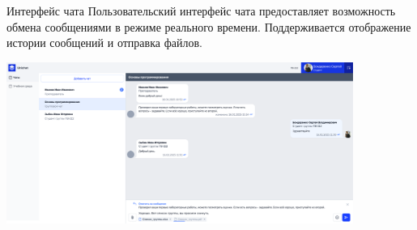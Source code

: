\documentclass[aspectratio=169]{beamer}
\begin{document}
\begin{frame}{Интерфейс чата}
\small
\justifying
Пользовательский интерфейс чата предоставляет возможность обмена сообщениями в режиме реального времени. Поддерживается отображение истории сообщений и отправка файлов.

\vspace{1em}

\centering
\includegraphics[width=0.85\textwidth]{static/ChatsStudentPage.png}
\end{frame}
\end{document}
